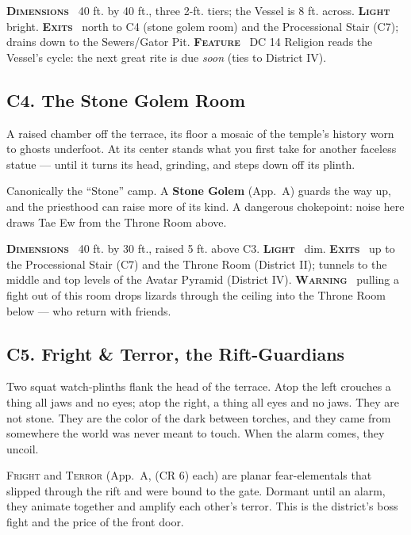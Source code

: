 \documentclass[10pt,twoside]{article}
\newcommand{\tech}[1]{\textbf{\scshape\textcolor{stone}{#1}}\ }
\newcommand{\CR}[1]{\textnormal{(CR #1)}}
\newcommand{\eqname}[1]{\textsc{#1}}
\begin{document}
\begin{techbox}
\tech{Dimensions} 40 ft. by 40 ft., three 2-ft. tiers; the Vessel is 8 ft. across.
\tech{Light} bright. \tech{Exits} north to C4 (stone golem room) and the Processional
Stair (C7); drains down to the Sewers/Gator Pit. \tech{Feature} DC 14 Religion reads
the Vessel's cycle: the next great rite is due \emph{soon} (ties to District IV).
\end{techbox}

\subsection{C4. The Stone Golem Room}
\begin{readaloud}
A raised chamber off the terrace, its floor a mosaic of the temple's history worn to
ghosts underfoot. At its center stands what you first take for another faceless
statue --- until it turns its head, grinding, and steps down off its plinth.
\end{readaloud}
Canonically the ``Stone'' camp. A \textbf{Stone Golem} (App.\ A) guards the way up,
and the priesthood can raise more of its kind. A dangerous chokepoint: noise here
draws Tae Ew from the Throne Room above.

\begin{techbox}
\tech{Dimensions} 40 ft. by 30 ft., raised 5 ft. above C3. \tech{Light} dim.
\tech{Exits} up to the Processional Stair (C7) and the Throne Room (District II);
tunnels to the middle and top levels of the Avatar Pyramid (District IV).
\tech{Warning} pulling a fight out of this room drops lizards through the ceiling
into the Throne Room below --- who return with friends.
\end{techbox}

\subsection{C5. Fright \& Terror, the Rift-Guardians}
\begin{readaloud}
Two squat watch-plinths flank the head of the terrace. Atop the left crouches a
thing all jaws and no eyes; atop the right, a thing all eyes and no jaws. They are
not stone. They are the color of the dark between torches, and they came from
somewhere the world was never meant to touch. When the alarm comes, they uncoil.
\end{readaloud}
\eqname{Fright} and \eqname{Terror} (App.\ A, \CR{6} each) are planar fear-elementals
that slipped through the rift and were bound to the gate. Dormant until an alarm, they
animate together and amplify each other's terror. This is the district's boss fight
and the price of the front door.
\end{document}
